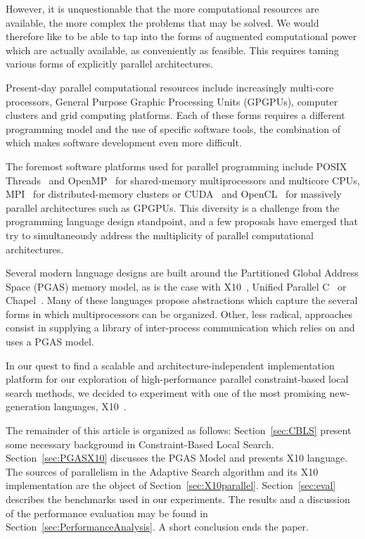 \documentclass{llncs}
\begin{document}
However, it is unquestionable that the more computational resources
are available, the more complex the problems that may be solved.  We
would therefore like to be able to tap into the forms of augmented
computational power which are actually available, as conveniently as
feasible.  This requires taming various forms of explicitly parallel
architectures.

Present-day parallel computational resources include increasingly
multi-core processors, General Purpose Graphic Processing Units
(GPGPUs), computer clusters and grid computing platforms.  Each of
these forms requires a different programming model and the use of
specific software tools, the combination of which makes software
development even more difficult.

The foremost software platforms used for parallel programming include
POSIX Threads~\cite{Butenhof1997} and OpenMP~\cite{OpenMP} for
shared-memory multiprocessors and multicore CPUs, MPI~\cite{Snir1996}
for distributed-memory clusters or CUDA~\cite{NVIDIAa} and
OpenCL~\cite{Opencl} for massively parallel architectures such as
GPGPUs.  This diversity is a challenge from the programming language
design standpoint, and a few proposals have emerged that try to
simultaneously address the multiplicity of parallel computational
architectures.



Several modern language designs are built around the Partitioned
Global Address Space (PGAS) memory model, as is the case with
X10~\cite{Saraswat2012}, Unified Parallel C~\cite{El-Ghazawi2005} or
Chapel~\cite{CrayInc.2012}.  Many of these languages propose
abstractions which capture the several forms in which multiprocessors
can be organized.  Other, less radical, approaches consist in
supplying a library of inter-process communication which relies on and
uses a PGAS model.



In our quest to find a scalable and architecture-independent
implementation platform for our exploration of high-performance
parallel constraint-based local search methods, we decided to
experiment with one of the most promising new-generation languages,
X10~\cite{Saraswat2012}.

The remainder of this article is organized as follows: Section~\ref{sec:CBLS}
present some necessary background in Constraint-Based Local Search.
Section~\ref{sec:PGASX10} discusses the PGAS Model and presents X10 language.
The sources of parallelism in the Adaptive Search algorithm and its X10
implementation are the object of Section~\ref{sec:X10parallel}.
Section~\ref{sec:eval} describes the benchmarks used in our experiments.  The
results and a discussion of the performance evaluation may be found in
Section~\ref{sec:PerformanceAnalysis}. A short conclusion ends the paper.
\end{document}
